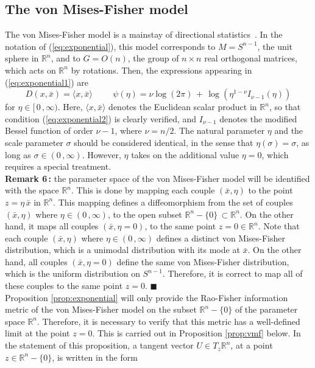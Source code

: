 \documentclass{svmult}
\begin{document}
\subsection{The von Mises-Fisher model} \label{subsec:vmf}
The von Mises-Fisher model is a mainstay of directional statistics~\cite{jupp,chikuse}. In the notation of  (\ref{eq:exponential}), this model corresponds to $M = S^{n-1}$, the unit sphere in $\mathbb{R}^{n}$, and to $G = O(n)$, the group of $n\times n$ real orthogonal matrices, which acts on $\mathbb{R}^n$ by rotations. Then, the expressions appearing in (\ref{eq:exponential1}) are
\begin{equation} \label{eq:vmf}
   D(x,\bar{x}) = \langle x,\bar{x}\rangle \hspace{1cm} \psi(\eta) = \nu\log(2\pi) \,+\,\log\left( \eta^{1-\nu}I_{\nu-1}(\eta)\right) 
\end{equation}
for $\eta \in [\,0\,,\infty)$. Here, $\langle x,\bar{x}\rangle$ denotes the Euclidean scalar product in $\mathbb{R}^n$, so that condition (\ref{eq:exponential2}) is clearly verified, and $I_{\nu - 1}$ denotes the modified Bessel function of order $\nu - 1$, where $\nu = n/2$. The natural parameter $\eta$ and the scale parameter $\sigma$ should be considered identical, in the sense that $\eta(\sigma) = \sigma$, as long as $\sigma \in (0\,,\infty)$. However, $\eta$ takes on the additional value $\eta = 0$, which requires a special treatment.\\[0.1cm]
\textbf{Remark 6\,:} the parameter space of the von Mises-Fisher model will be identified with the space $\mathbb{R}^n$. This is done by mapping each couple $(\bar{x},\eta)$ to the point $z =\eta\,\bar{x}$ in $\mathbb{R}^n$. This mapping defines a diffeomorphism from the set of couples $(\bar{x},\eta)$ where $\eta \in (0\,,\infty)$, to the open subset $\mathbb{R}^n - \lbrace 0 \rbrace \,\subset \mathbb{R}^n$. On the other hand, it maps all couples 
$(\bar{x},\eta=0)$, to the same point $z = 0 \in \mathbb{R}^n$. Note that each couple $(\bar{x},\eta)$ where $\eta \in (0\,,\infty)$ defines a distinct von Mises-Fisher distribution, which is a unimodal distribution with its mode at $\bar{x}$. On the other hand, all couples $(\bar{x},\eta=0)$ define the same von Mises-Fisher distribution, which is the uniform distribution on $S^{n-1}$. Therefore, it is correct to map all of these couples to the same point $z = 0$. \hfill$\blacksquare$ \\[0.1cm]
Proposition \ref{prop:exponential} will only provide the Rao-Fisher information metric of the von Mises-Fisher model on the subset $\mathbb{R}^n - \lbrace 0 \rbrace$ of the parameter space $\mathbb{R}^n$. Therefore, it is necessary to verify that this metric has a well-defined limit at the point $z = 0$. This is carried out in Proposition \ref{prop:vmf} below. In the statement of this proposition, a tangent vector $U \in T_z\mathbb{R}^n$, at a point $z \in \mathbb{R}^n - \lbrace 0 \rbrace$, is written in the form
\end{document}
